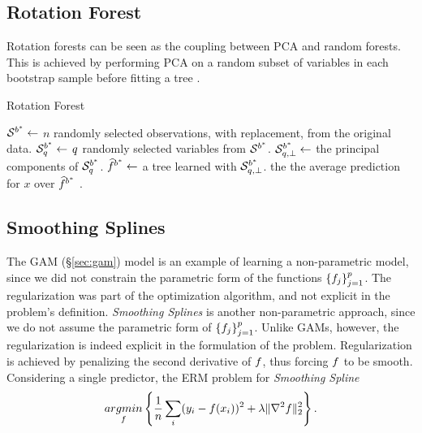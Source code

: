 \subsection{Rotation Forest}
\label{sec:rotation_forest}

Rotation forests can be seen as the coupling between PCA and random forests. 
This is achieved by performing PCA on a random subset of variables in each bootstrap sample before fitting a tree \citep{rodriguez_rotation_2006}.

\begin{algorithm}[H]
\caption{Rotation Forest}
\begin{algorithmic}
	\State $\mathcal{S}^{b^*} \gets$ $n$ randomly selected observations, with replacement, from the original data.
	\State $\mathcal{S}^{b^*}_q \gets$ $q$ randomly selected variables from $\mathcal{S}^{b^*}$.
	\State $\mathcal{S}^{b^*}_{q,\perp} \gets$ the principal components of $\mathcal{S}^{b^*}_q$.
    \State $\widehat{f}^{{b^*}} \gets$ a tree learned with  $\mathcal{S}^{b^*}_{q,\perp}$.
\EndFor
\State \Return the the average prediction for $x$ over $\widehat{f}^{{b^*}}$ .
\end{algorithmic}
\end{algorithm}






\subsection{Smoothing Splines}
\label{sec:smoothing_splines}
The GAM (\S\ref{sec:gam}) model is an example of learning a non-parametric model, since we did not constrain the parametric form of the functions $\left\{ f_j \right\}_{j=1}^p$. The regularization was part of the optimization algorithm, and not explicit in the problem's definition.
\emph{Smoothing Splines} is another non-parametric approach, since we do not assume the parametric form of $\left\{ f_j \right\}_{j=1}^p$. 
Unlike GAMs, however, the regularization is indeed explicit in the formulation of the problem. 
Regularization is achieved by penalizing the second derivative of $f$, thus forcing $f$ to be smooth. 
Considering a single predictor, the ERM problem for \emph{Smoothing Spline}
\begin{align}
\label{eq:smoothing_spline}
	 \mathop{argmin} _{f}\left\{ \frac{1}{n}\sum_i (y_i-f(x_i))^2 + \lambda \Vert \nabla^2 f \Vert_2^2   \right\}.
\end{align}

